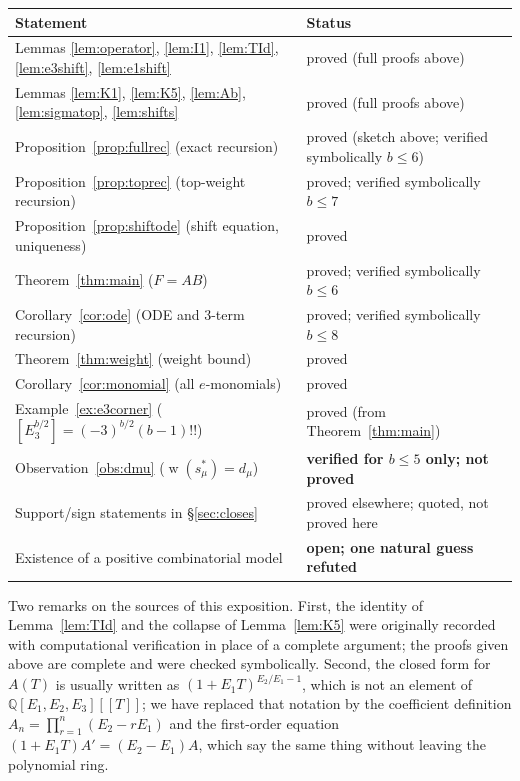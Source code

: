 \documentclass[10pt]{article}
\theoremstyle{plain}
\theoremstyle{definition}
\newcommand{\bbQ}{\mathbb{Q}}
\newcommand{\wt}{\operatorname{w}}
\begin{document}
\begin{center}\small
\begin{tabular}{ll}
\toprule
Statement & Status\\
\midrule
Lemmas \ref{lem:operator}, \ref{lem:I1}, \ref{lem:TId}, \ref{lem:e3shift},
 \ref{lem:e1shift} & proved (full proofs above)\\
Lemmas \ref{lem:K1}, \ref{lem:K5}, \ref{lem:Ab}, \ref{lem:sigmatop},
 \ref{lem:shifts} & proved (full proofs above)\\
Proposition~\ref{prop:fullrec} (exact recursion) & proved (sketch above; verified
 symbolically $b\le6$)\\
Proposition~\ref{prop:toprec} (top-weight recursion) & proved; verified symbolically
 $b\le7$\\
Proposition~\ref{prop:shiftode} (shift equation, uniqueness) & proved\\
Theorem~\ref{thm:main} ($F=AB$) & proved; verified symbolically $b\le6$\\
Corollary~\ref{cor:ode} (ODE and 3-term recursion) & proved; verified symbolically $b\le8$\\
Theorem~\ref{thm:weight} (weight bound) & proved\\
Corollary~\ref{cor:monomial} (all $e$-monomials) & proved\\
Example~\ref{ex:e3corner} ($[E_3^{b/2}]=(-3)^{b/2}(b-1)!!$) & proved (from
 Theorem~\ref{thm:main})\\
Observation~\ref{obs:dmu} ($\wt(s^*_\mu)=d_\mu$) & \textbf{verified for $b\le5$ only;
 not proved}\\
Support/sign statements in \S\ref{sec:closes} & proved elsewhere; quoted, not proved here\\
Existence of a positive combinatorial model & \textbf{open; one natural guess refuted}\\
\bottomrule
\end{tabular}
\end{center}

\noindent Two remarks on the sources of this exposition. First, the identity of
Lemma~\ref{lem:TId} and the collapse of Lemma~\ref{lem:K5} were originally recorded with
computational verification in place of a complete argument; the proofs given above are
complete and were checked symbolically. Second, the closed form for $A(T)$ is usually written
as $(1+E_1T)^{E_2/E_1-1}$, which is not an element of $\bbQ[E_1,E_2,E_3][[T]]$; we have
replaced that notation by the coefficient definition $A_n=\prod_{r=1}^n(E_2-rE_1)$ and the
first-order equation $(1+E_1T)A'=(E_2-E_1)A$, which say the same thing without leaving the
polynomial ring.
\end{document}
